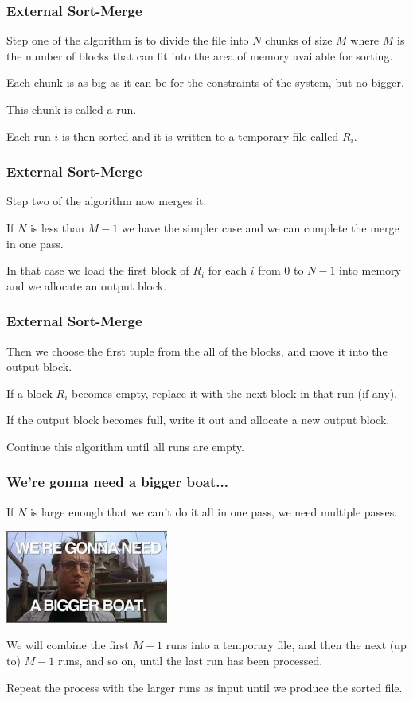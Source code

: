 \begin{frame}
\frametitle{External Sort-Merge}

Step one of the algorithm is to divide the file into $N$ chunks of size $M$ where $M$ is the number of blocks that can fit into the area of memory available for sorting.

Each chunk is as big as it can be for the constraints of the system, but no bigger.

This chunk is called a \alert{run}. 

Each run $i$ is then sorted and it is written to a temporary file called $R_{i}$.


\end{frame}

\begin{frame}
\frametitle{External Sort-Merge}
Step two of the algorithm now merges it. 

If $N$ is less than $M-1$ we have the simpler case and we can complete the merge in one pass. 

In that case we load the first block of $R_{i}$ for each $i$ from $0$ to $N-1$ into memory and we allocate an output block. 

\end{frame}

\begin{frame}
\frametitle{External Sort-Merge}

Then we choose the first tuple from the all of the blocks, and move it into the output block. 

If a block $R_{i}$ becomes empty, replace it with the next block in that run (if any).

 If the output block becomes full, write it out and allocate a new output block. 
 
 Continue this algorithm until all runs are empty. 

\end{frame}


\begin{frame}
\frametitle{We're gonna need a bigger boat...}

If $N$ is large enough that we can't do it all in one pass, we need multiple passes. 

\begin{center}
	\includegraphics[width=0.4\textwidth]{images/biggerboat.jpg}
\end{center}

We will combine the first $M-1$ runs into a temporary file, and then the next (up to) $M-1$ runs, and so on, until the last run has been processed. 

Repeat the process with the larger runs as input until we produce the sorted file.

\end{frame}

